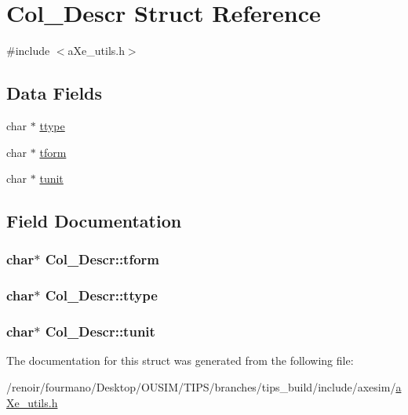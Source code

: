 \hypertarget{structCol__Descr}{
\section{Col\_\-Descr Struct Reference}
\label{structCol__Descr}
}


{\ttfamily \#include $<$aXe\_\-utils.h$>$}\subsection*{Data Fields}
\begin{DoxyCompactItemize}
\item 
char $\ast$ \hyperlink{structCol__Descr_af5ee028efb2b6e22ccb8e7a54604ab02}{ttype}
\item 
char $\ast$ \hyperlink{structCol__Descr_a5ad3c37d211910766ed08e553b86d17a}{tform}
\item 
char $\ast$ \hyperlink{structCol__Descr_ac5a0fbd1953a39e0b3b5904c8c3de3a3}{tunit}
\end{DoxyCompactItemize}


\subsection{Field Documentation}
\hypertarget{structCol__Descr_a5ad3c37d211910766ed08e553b86d17a}{
\subsubsection[{tform}]{\setlength{\rightskip}{0pt plus 5cm}char$\ast$ {\bf Col\_\-Descr::tform}}}
\label{structCol__Descr_a5ad3c37d211910766ed08e553b86d17a}
\hypertarget{structCol__Descr_af5ee028efb2b6e22ccb8e7a54604ab02}{
\subsubsection[{ttype}]{\setlength{\rightskip}{0pt plus 5cm}char$\ast$ {\bf Col\_\-Descr::ttype}}}
\label{structCol__Descr_af5ee028efb2b6e22ccb8e7a54604ab02}
\hypertarget{structCol__Descr_ac5a0fbd1953a39e0b3b5904c8c3de3a3}{
\subsubsection[{tunit}]{\setlength{\rightskip}{0pt plus 5cm}char$\ast$ {\bf Col\_\-Descr::tunit}}}
\label{structCol__Descr_ac5a0fbd1953a39e0b3b5904c8c3de3a3}


The documentation for this struct was generated from the following file:\begin{DoxyCompactItemize}
\item 
/renoir/fourmano/Desktop/OUSIM/TIPS/branches/tips\_\-build/include/axesim/\hyperlink{aXe__utils_8h}{aXe\_\-utils.h}\end{DoxyCompactItemize}
